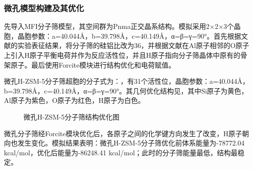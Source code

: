 \subsubsection{微孔模型构建及其优化}
\par{先导入MFI分子筛模型，其空间群为Pnma正交晶系结构。模拟采用2×2×3个晶胞\cite{bu2018diffusion}，晶胞参数：a=40.044Å，b=39.798Å，c=40.149Å，α=β=γ=90°。首先根据文献\cite{danuthai2009conversion}的实验表征结果，将分子筛的硅铝比改为36，并根据文献\cite{zheng2014influence,zheng2016molecular}在Al原子相邻的O原子上引入H原子平衡电荷并作为反应活性位，并且H原子指向分子筛晶体中原有的骨架原子。最后使用Forcite模块进行结构优化和电荷赋值。}
\par{微孔H-ZSM-5分子筛超胞的分子式为：，有31个活性位，晶胞参数：a=40.044Å，b=39.798Å，c=40.149Å，α=β=γ=90°。其几何优化结构见，其中Si原子为黄色，Al原子为紫色，O原子为红色，H原子为白色。}
\begin{figure}[H]
    \centering

    \caption{微孔H-ZSM-5分子筛结构优化图}
    \label{fig:mZSM}
\end{figure}
\par{微孔分子筛经Forcite模块优化后，各原子之间的化学键方向发生了改变，H原子朝向也发生变化。模拟结果表明：微孔H-ZSM-5分子筛优化前体系能量为-78772.04 kcal/mol，优化后能量为-86248.41 kcal/mol；此时的分子筛能量最低，结构最稳定。}
